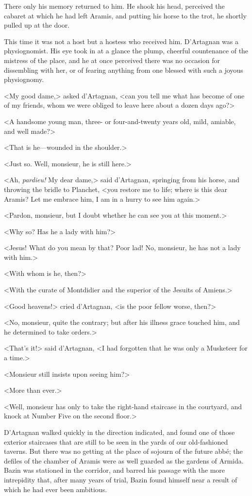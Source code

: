 There only his memory returned to him. He shook his head, perceived the cabaret at which he had left Aramis, and putting his horse to the trot, he shortly pulled up at the door. 

This time it was not a host but a hostess who received him. D'Artagnan was a physiognomist. His eye took in at a glance the plump, cheerful countenance of the mistress of the place, and he at once perceived there was no occasion for dissembling with her, or of fearing anything from one blessed with such a joyous physiognomy. 

<My good dame,> asked d'Artagnan, <can you tell me what has become of one of my friends, whom we were obliged to leave here about a dozen days ago?> 

<A handsome young man, three- or four-and-twenty years old, mild, amiable, and well made?> 

<That is he---wounded in the shoulder.> 

<Just so. Well, monsieur, he is still here.> 

<Ah, \textit{pardieu!} My dear dame,> said d'Artagnan, springing from his horse, and throwing the bridle to Planchet, <you restore me to life; where is this dear Aramis? Let me embrace him, I am in a hurry to see him again.> 

<Pardon, monsieur, but I doubt whether he can see you at this moment.> 

<Why so? Has he a lady with him?> 

<Jesus! What do you mean by that? Poor lad! No, monsieur, he has not a lady with him.> 

<With whom is he, then?> 

<With the curate of Montdidier and the superior of the Jesuits of Amiens.> 

<Good heavens!> cried d'Artagnan, <is the poor fellow worse, then?> 

<No, monsieur, quite the contrary; but after his illness grace touched him, and he determined to take orders.> 

<That's it!> said d'Artagnan, <I had forgotten that he was only a Musketeer for a time.> 

<Monsieur still insists upon seeing him?> 

<More than ever.> 

<Well, monsieur has only to take the right-hand staircase in the courtyard, and knock at Number Five on the second floor.> 

D'Artagnan walked quickly in the direction indicated, and found one of those exterior staircases that are still to be seen in the yards of our old-fashioned taverns. But there was no getting at the place of sojourn of the future abbé; the defiles of the chamber of Aramis were as well guarded as the gardens of Armida. Bazin was stationed in the corridor, and barred his passage with the more intrepidity that, after many years of trial, Bazin found himself near a result of which he had ever been ambitious. 

